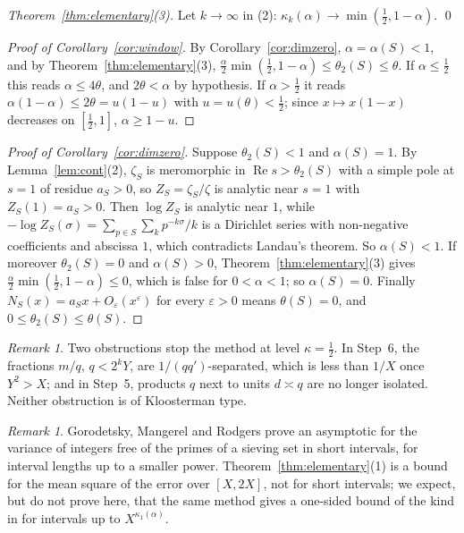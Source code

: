 \documentclass[11pt]{amsart}
\theoremstyle{remark}
\newtheorem{remark}[lemma]{Remark}
\numberwithin{equation}{section}
\newcommand{\eps}{\varepsilon}
\DeclareMathOperator{\re}{Re}
\begin{document}
\emph{Theorem~\ref{thm:elementary}(3).} Let $k\to\infty$ in (2): $\kappa_k(\alpha)\to\min(\tfrac12,1-\alpha)$. \qed

\begin{proof}[Proof of Corollary~\ref{cor:window}]
By Corollary~\ref{cor:dimzero}, $\alpha=\alpha(S)<1$, and by Theorem~\ref{thm:elementary}(3), $\tfrac\alpha2\min(\tfrac12,1-\alpha)\le\theta_2(S)\le\theta$. If $\alpha\le\tfrac12$ this reads $\alpha\le4\theta$, and $2\theta<\alpha$ by hypothesis. If $\alpha>\tfrac12$ it reads $\alpha(1-\alpha)\le2\theta=u(1-u)$ with $u=u(\theta)<\tfrac12$; since $x\mapsto x(1-x)$ decreases on $[\tfrac12,1]$, $\alpha\ge1-u$.
\end{proof}

\begin{proof}[Proof of Corollary~\ref{cor:dimzero}]
Suppose $\theta_2(S)<1$ and $\alpha(S)=1$. By Lemma~\ref{lem:cont}(2), $\zeta_S$ is meromorphic in $\re s>\theta_2(S)$ with a simple pole at $s=1$ of residue $a_S>0$, so $Z_S=\zeta_S/\zeta$ is analytic near $s=1$ with $Z_S(1)=a_S>0$. Then $\log Z_S$ is analytic near $1$, while $-\log Z_S(\sigma)=\sum_{p\in S}\sum_kp^{-k\sigma}/k$ is a Dirichlet series with non-negative coefficients and abscissa $1$, which contradicts Landau's theorem. So $\alpha(S)<1$. If moreover $\theta_2(S)=0$ and $\alpha(S)>0$, Theorem~\ref{thm:elementary}(3) gives $\tfrac{\alpha}{2}\min(\tfrac12,1-\alpha)\le0$, which is false for $0<\alpha<1$; so $\alpha(S)=0$. Finally $N_S(x)=a_Sx+O_\eps(x^{\eps})$ for every $\eps>0$ means $\theta(S)=0$, and $0\le\theta_2(S)\le\theta(S)$.
\end{proof}

\begin{remark}
Two obstructions stop the method at level $\kappa=\tfrac12$. In Step~6, the fractions $m/q$, $q<2^kY$, are $1/(qq')$-separated, which is less than $1/X$ once $Y^2>X$; and in Step~5, products $q$ next to units $d\asymp q$ are no longer isolated. Neither obstruction is of Kloosterman type.
\end{remark}

\begin{remark}
Gorodetsky, Mangerel and Rodgers \cite{GMR} prove an asymptotic for the variance of integers free of the primes of a sieving set in short intervals, for interval lengths up to a smaller power. Theorem~\ref{thm:elementary}(1) is a bound for the mean square of the error over $[X,2X]$, not for short intervals; we expect, but do not prove here, that the same method gives a one-sided bound of the kind in \cite{GMR} for intervals up to $X^{\kappa_1(\alpha)}$.
\end{remark}
\end{document}
